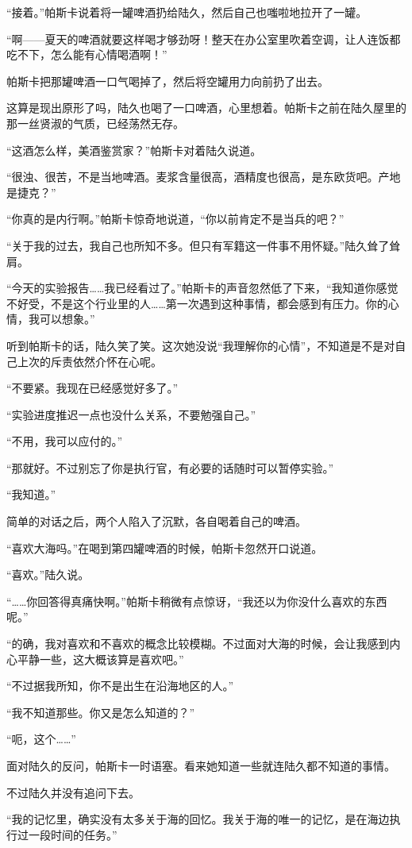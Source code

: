 “接着。”帕斯卡说着将一罐啤酒扔给陆久，然后自己也嗤啦地拉开了一罐。

“啊——夏天的啤酒就要这样喝才够劲呀！整天在办公室里吹着空调，让人连饭都吃不下，怎么能有心情喝酒啊！”

帕斯卡把那罐啤酒一口气喝掉了，然后将空罐用力向前扔了出去。

这算是现出原形了吗，陆久也喝了一口啤酒，心里想着。帕斯卡之前在陆久屋里的那一丝贤淑的气质，已经荡然无存。

“这酒怎么样，美酒鉴赏家？”帕斯卡对着陆久说道。

“很浊、很苦，不是当地啤酒。麦浆含量很高，酒精度也很高，是东欧货吧。产地是捷克？”

“你真的是内行啊。”帕斯卡惊奇地说道，“你以前肯定不是当兵的吧？”

“关于我的过去，我自己也所知不多。但只有军籍这一件事不用怀疑。”陆久耸了耸肩。

“今天的实验报告……我已经看过了。”帕斯卡的声音忽然低了下来，“我知道你感觉不好受，不是这个行业里的人……第一次遇到这种事情，都会感到有压力。你的心情，我可以想象。”

听到帕斯卡的话，陆久笑了笑。这次她没说“我理解你的心情”，不知道是不是对自己上次的斥责依然介怀在心呢。

“不要紧。我现在已经感觉好多了。”

“实验进度推迟一点也没什么关系，不要勉强自己。”

“不用，我可以应付的。”

“那就好。不过别忘了你是执行官，有必要的话随时可以暂停实验。”

“我知道。”

简单的对话之后，两个人陷入了沉默，各自喝着自己的啤酒。

“喜欢大海吗。”在喝到第四罐啤酒的时候，帕斯卡忽然开口说道。

“喜欢。”陆久说。

“……你回答得真痛快啊。”帕斯卡稍微有点惊讶，“我还以为你没什么喜欢的东西呢。”

“的确，我对喜欢和不喜欢的概念比较模糊。不过面对大海的时候，会让我感到内心平静一些，这大概该算是喜欢吧。”

“不过据我所知，你不是出生在沿海地区的人。”

“我不知道那些。你又是怎么知道的？”

“呃，这个……”

面对陆久的反问，帕斯卡一时语塞。看来她知道一些就连陆久都不知道的事情。

不过陆久并没有追问下去。

“我的记忆里，确实没有太多关于海的回忆。我关于海的唯一的记忆，是在海边执行过一段时间的任务。”

